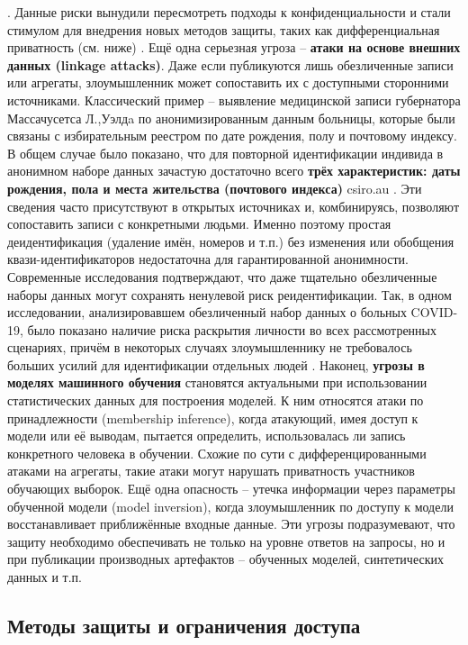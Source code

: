 \autocite{blog-seas-upenn-edu}
. Данные риски вынудили пересмотреть подходы к конфиденциальности и стали стимулом для внедрения новых методов защиты, таких как дифференциальная приватность (см. ниже)
\autocite{blog-seas-upenn-edu}
. Ещё одна серьезная угроза – \textbf{атаки на основе внешних данных (linkage attacks)}. Даже если публикуются лишь обезличенные записи или агрегаты, злоумышленник может сопоставить их с доступными сторонними источниками. Классический пример – выявление медицинской записи губернатора Массачусетса Л.,Уэлдa по анонимизированным данным больницы, которые были связаны с избирательным реестром по дате рождения, полу и почтовому индексу. В общем случае было показано, что для повторной идентификации индивида в анонимном наборе данных зачастую достаточно всего \textbf{трёх характеристик: даты рождения, пола и места жительства (почтового индекса)}
csiro.au
. Эти сведения часто присутствуют в открытых источниках и, комбинируясь, позволяют сопоставить записи с конкретными людьми. Именно поэтому простая деидентификация (удаление имён, номеров и т.п.) без изменения или обобщения квази-идентификаторов недостаточна для гарантированной анонимности. Современные исследования подтверждают, что даже тщательно обезличенные наборы данных могут сохранять ненулевой риск реидентификации. Так, в одном исследовании, анализировавшем обезличенный набор данных о больных COVID-19, было показано наличие риска раскрытия личности во всех рассмотренных сценариях, причём в некоторых случаях злоумышленнику не требовалось больших усилий для идентификации отдельных людей
\autocite{journals-plos-org}
. Наконец, \textbf{угрозы в моделях машинного обучения} становятся актуальными при использовании статистических данных для построения моделей. К ним относятся атаки по принадлежности (membership inference), когда атакующий, имея доступ к модели или её выводам, пытается определить, использовалась ли запись конкретного человека в обучении. Схожие по сути с дифференцированными атаками на агрегаты, такие атаки могут нарушать приватность участников обучающих выборок. Ещё одна опасность – утечка информации через параметры обученной модели (model inversion), когда злоумышленник по доступу к модели восстанавливает приближённые входные данные. Эти угрозы подразумевают, что защиту необходимо обеспечивать не только на уровне ответов на запросы, но и при публикации производных артефактов – обученных моделей, синтетических данных и т.п. \subsection{Методы защиты и ограничения доступа}
